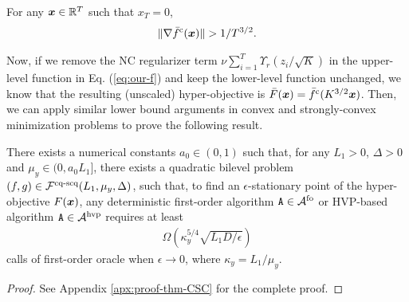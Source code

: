 \documentclass{article}
\begin{document}
\begin{lem} \label{lem:Car-large-grad-convex}
For any ${\bm{x}} \in {\mathbb{R}}^T$ such that $x_{T}= 0$, 
\begin{align*}
    \Vert \nabla \bar f^{\rm c}({\bm{x}}) \Vert > 1/ T^{3/2}.
\end{align*}
\end{lem}

Now, if we remove the NC regularizer term $\nu \sum_{i=1}^{T} \Upsilon_r ( {z_i}/{\sqrt{K}} )$ in the upper-level function in Eq. (\ref{eq:our-f}) and keep the lower-level function unchanged, we know that the resulting (unscaled) hyper-objective is $\bar F({\bm{x}}) = \bar f^{\rm c}(K^{3/2}{\bm{x}})$. 
Then, we can apply similar lower bound arguments
in convex and strongly-convex minimization problems \citep{nesterov2018lectures,carmon2021lower} to prove the following result.



\begin{thm} \label{thm:C-SC}
There exists a numerical constants $a_0 \in (0,1)$ such that, 
for any $ L_1>0$, $\Delta >0$ and $\mu_y \in (0, a_0  L_1]$, there exists a quadratic   bilevel problem $(f, g) \in {\mathcal{F}}^{\text{cq-scq}}(L_1, \mu_y, \Delta)$, such that, to find an $\epsilon$-stationary point of the  hyper-objective  $F({\bm{x}})$, any deterministic  first-order algorithm $\texttt{A} \in {\mathcal{A}}^{\rm fo}$ or HVP-based algorithm $\texttt{A} \in {\mathcal{A}}^{\rm hvp}$ requires at least
    \begin{align*}
        \Omega\left( \kappa_y^{5/4} \sqrt{  L_1  D/ \epsilon} \right)
    \end{align*}
calls of first-order oracle when $\epsilon \rightarrow 0$, where $\kappa_y = L_1/\mu_y$.
\end{thm}

\begin{proof}
    See Appendix \ref{apx:proof-thm-CSC} for the complete proof.
\end{proof}
\end{document}
